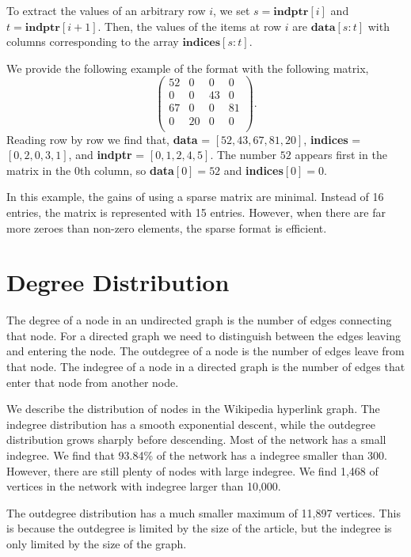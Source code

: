 \documentclass{article}
\begin{document}
To extract the values of an arbitrary row $i$, we set $s = \textbf{indptr}[i]$ and $t = \textbf{indptr}[i+1]$. Then, the values of the items at row $i$ are $\textbf{data}[s:t]$ with columns corresponding to the array $\textbf{indices}[s:t]$. 

We provide the following example of the format with the following matrix,
\begin{equation*}
    \begin{pmatrix}
        52 & 0  & 0  & 0  \\
        0  & 0  & 43 & 0  \\
        67 & 0  & 0  & 81  \\
        0  & 20 & 0  & 0  \\
    \end{pmatrix}.
\end{equation*}
Reading row by row we find that, \textbf{data} = $[52, 43, 67, 81, 20]$, \textbf{indices} = $[0, 2, 0, 3, 1]$, and \textbf{indptr} = $[0, 1, 2, 4, 5]$. The number $52$ appears first in the matrix in the 0th column, so \textbf{data}$[0] = 52$ and \textbf{indices}$[0] = 0$.

In this example, the gains of using a sparse matrix are minimal. Instead of 16 entries, the matrix is represented with 15 entries. However, when there are far more zeroes than non-zero elements, the sparse format is efficient.


\section{Degree Distribution}

The degree of a node in an undirected graph is the number of edges connecting that node. For a directed graph we need to distinguish between the edges leaving and entering the node. 
The outdegree of a node is the number of edges leave from that node.
The indegree of a node in a directed graph is the number of edges that enter that node from another node.

We describe the distribution of nodes in the Wikipedia hyperlink graph.
The indegree distribution has a smooth exponential descent, while the outdegree distribution grows sharply before descending. 
Most of the network has a small indegree. We find that 93.84\% of the network has a indegree smaller than 300. However, there are still plenty of nodes with large indegree. We find 1,468 of vertices in the network with indegree larger than 10,000.

The outdegree distribution has a much smaller maximum of 11,897 vertices. This is because the outdegree is limited by the size of the article, but the indegree is only limited by the size of the graph.
\end{document}
